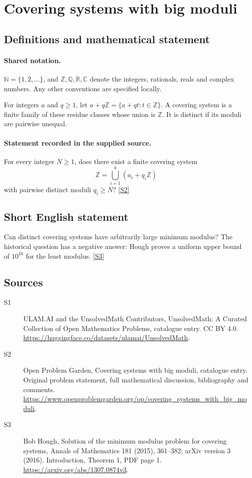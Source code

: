 \documentclass[11pt]{article}
\newcommand{\sref}[2]{\hyperlink{source:#1:#2}{[S#2]}}
\begin{document}
\section{Covering systems with big moduli}\label{statement}

\subsection{Definitions and mathematical statement}

\paragraph{Shared notation.}$\mathbb N=\{1,2,\ldots\}$, and $\mathbb Z,\mathbb Q,\mathbb R,\mathbb C$ denote the integers, rationals, reals and complex numbers. Any other conventions are specified locally.


For integers $a$ and $q\ge1$, let $a+q\mathbb Z=\{a+qt:t\in\mathbb Z\}$. A covering system is a finite family of these residue classes whose union is $\mathbb Z$. It is distinct if its moduli are pairwise unequal.
\paragraph{Statement recorded in the supplied source.}
For every integer $N\ge1$, does there exist a finite covering system
\[
 \mathbb Z=\bigcup_{i=1}^k(a_i+q_i\mathbb Z)
\]
with pairwise distinct moduli $q_i\ge N$? \sref{statement}{2}
\subsection{Short English statement}
Can distinct covering systems have arbitrarily large minimum modulus? The historical question has a negative answer: Hough proves a uniform upper bound of $10^{16}$ for the least modulus. \sref{statement}{3}
\subsection{Sources}
\begin{description}
\item[\hypertarget{source:statement:1}{S1}] ULAM.AI and the UnsolvedMath Contributors, UnsolvedMath: A Curated Collection of Open Mathematics Problems, catalogue entry. CC BY 4.0. \url{https://huggingface.co/datasets/ulamai/UnsolvedMath}.
\item[\hypertarget{source:statement:2}{S2}] Open Problem Garden, Covering systems with big moduli, catalogue entry. Original problem statement, full mathematical discussion, bibliography and comments. \url{https://www.openproblemgarden.org/op/covering_systems_with_big_moduli}.
\item[\hypertarget{source:statement:3}{S3}] Bob Hough, Solution of the minimum modulus problem for covering systems, Annals of Mathematics 181 (2015), 361--382; arXiv version 3 (2016). Introduction, Theorem 1, PDF page 1. \url{https://arxiv.org/abs/1307.0874v3}.
\end{description}
\label{end:statement}
\end{document}
